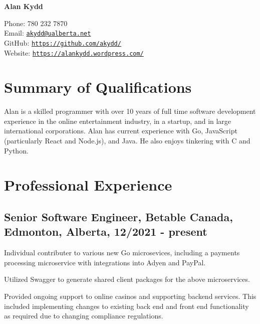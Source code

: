 \documentclass[10.5pt, letterpaper]{article}
\def\name{Alan Kydd}
\renewenvironment{itemize}{
  \begin{list}{}{
    \setlength{\leftmargin}{1.5em}
  }
}{
  \end{list}
}
\begin{document}
{\huge\bf\name}


\vspace{0.25in}

\begin{minipage}{0.45\linewidth}
  Phone: 780 232 7870 \\
  Email: \href{mailto:akydd@ualberta.net}{\tt akydd@ualberta.net} \\
  GitHub: \href{https://github.com/akydd/}{\tt https://github.com/akydd/} \\
  Website: \href{https://alankydd.wordpress.com/}{\tt https://alankydd.wordpress.com/}
\end{minipage}


\section*{Summary of Qualifications}
Alan is a skilled programmer with over 10 years of full time software development
experience in the online entertainment industry, in a startup, and in large
international corporations.  Alan has
current experience with Go, JavaScript (particularly React and Node.js), and Java.
He also enjoys tinkering with C and Python.

\begin{comment}
\section*{Objective}
Work as a developer on a multi-tiered web application
\end{comment}

\section*{Professional Experience}

\subsection*{Senior Software Engineer, Betable Canada, Edmonton, Alberta, 12/2021 - present}
\begin{itemize}
\item Individual contributer to various new Go microsevices, including a payments processing microservice with
integrations into Adyen and PayPal.
\item Utilized Swagger to generate shared client packages for the above microservices.
\item Provided ongoing support to online casinos and supporting backend services. This included implementing
changes to existing back end and front end functionality as required due to changing compliance regulations.
\end{itemize}
\end{document}
